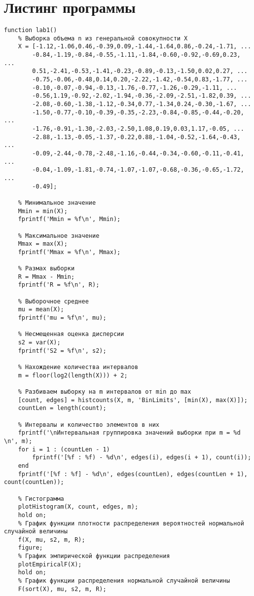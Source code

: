 \documentclass[a4paper, 12pt]{article}
\theoremstyle{definition}
\begin{document}
\newpage
\section{Листинг программы}

\begin{lstlisting}
function lab1()
    % Выборка объема n из генеральной совокупности Х
    X = [-1.12,-1.06,0.46,-0.39,0.09,-1.44,-1.64,0.86,-0.24,-1.71, ...
        -0.84,-1.19,-0.84,-0.55,-1.11,-1.84,-0.60,-0.92,-0.69,0.23, ...
        0.51,-2.41,-0.53,-1.41,-0.23,-0.89,-0.13,-1.50,0.02,0.27, ...
        -0.75,-0.06,-0.48,0.14,0.20,-2.22,-1.42,-0.54,0.83,-1.77, ...
        -0.10,-0.07,-0.94,-0.13,-1.76,-0.77,-1.26,-0.29,-1.11, ...
        -0.56,1.19,-0.92,-2.02,-1.94,-0.36,-2.09,-2.51,-1.82,0.39, ...
        -2.08,-0.60,-1.38,-1.12,-0.34,0.77,-1.34,0.24,-0.30,-1.67, ...
        -1.50,-0.77,-0.10,-0.39,-0.35,-2.23,-0.84,-0.85,-0.44,-0.20, ...
        -1.76,-0.91,-1.30,-2.03,-2.50,1.08,0.19,0.03,1.17,-0.05, ...
        -2.88,-1.13,-0.05,-1.37,-0.22,0.88,-1.04,-0.52,-1.64,-0.43, ...
        -0.09,-2.44,-0.78,-2.48,-1.16,-0.44,-0.34,-0.60,-0.11,-0.41, ...
        -0.04,-1.09,-1.81,-0.74,-1.07,-1.07,-0.68,-0.36,-0.65,-1.72, ...
        -0.49];
    
    % Минимальное значение
    Mmin = min(X);
    fprintf('Mmin = %f\n', Mmin);
    
    % Максимальное значение
    Mmax = max(X);
    fprintf('Mmax = %f\n', Mmax);
    
    % Размах выборки
    R = Mmax - Mmin;
    fprintf('R = %f\n', R);
    
    % Выборочное среднее
    mu = mean(X);
    fprintf('mu = %f\n', mu);
    
    % Несмещенная оценка дисперсии
    s2 = var(X);
    fprintf('S2 = %f\n', s2);

    % Нахождение количества интервалов
    m = floor(log2(length(X))) + 2;
    
    % Разбиваем выборку на m интервалов от min до max
    [count, edges] = histcounts(X, m, 'BinLimits', [min(X), max(X)]);
    countLen = length(count);
    
    % Интервалы и количество элементов в них
    fprintf('\nИнтервальная группировка значений выборки при m = %d \n', m);
    for i = 1 : (countLen - 1)
        fprintf('[%f : %f) - %d\n', edges(i), edges(i + 1), count(i));
    end
    fprintf('[%f : %f] - %d\n', edges(countLen), edges(countLen + 1), count(countLen));
    
    % Гистограмма
    plotHistogram(X, count, edges, m);
    hold on; 
    % График функции плотности распределения вероятностей нормальной случайной величины
    f(X, mu, s2, m, R);
    figure;
    % График эмпирической функции распределения
    plotEmpiricalF(X);
    hold on;
    % График функции распределения нормальной случайной величины
    F(sort(X), mu, s2, m, R);
    

\end{lstlisting}
\end{document}
